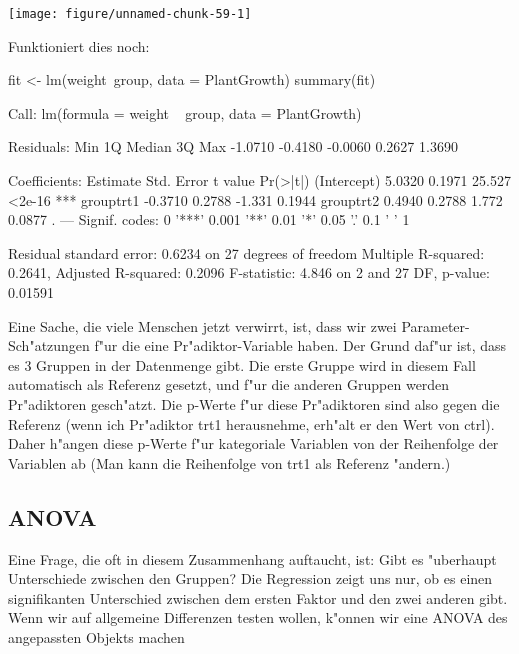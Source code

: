 \documentclass[a4paper,twoside]{tufte-book}\usepackage[]{graphicx}\usepackage[]{color}
\makeatletter
\def\maxwidth{ %
  \ifdim\Gin@nat@width>\linewidth
    \linewidth
  \else
    \Gin@nat@width
  \fi
}
\makeatother
\begin{document}
\begin{appendices}
\begin{Schunk}
\texttt{[image: figure/unnamed-chunk-59-1]} \end{Schunk}

Funktioniert dies noch:

\begin{Schunk}
\begin{Sinput}
fit <- lm(weight~group, data = PlantGrowth)
summary(fit)
\end{Sinput}
\begin{Soutput}

Call:
lm(formula = weight ~ group, data = PlantGrowth)

Residuals:
    Min      1Q  Median      3Q     Max 
-1.0710 -0.4180 -0.0060  0.2627  1.3690 

Coefficients:
            Estimate Std. Error t value Pr(>|t|)    
(Intercept)   5.0320     0.1971  25.527   <2e-16 ***
grouptrt1    -0.3710     0.2788  -1.331   0.1944    
grouptrt2     0.4940     0.2788   1.772   0.0877 .  
---
Signif. codes:  0 '***' 0.001 '**' 0.01 '*' 0.05 '.' 0.1 ' ' 1

Residual standard error: 0.6234 on 27 degrees of freedom
Multiple R-squared:  0.2641,	Adjusted R-squared:  0.2096 
F-statistic: 4.846 on 2 and 27 DF,  p-value: 0.01591
\end{Soutput}
\end{Schunk}

Eine Sache, die viele Menschen jetzt verwirrt, ist, dass wir zwei Parameter-Sch"atzungen f"ur die eine Pr"adiktor-Variable haben. Der Grund daf"ur ist, dass es 3 Gruppen in der Datenmenge gibt. Die erste Gruppe wird in diesem Fall automatisch als Referenz gesetzt, und f"ur die anderen Gruppen werden Pr"adiktoren gesch"atzt. Die p-Werte f"ur diese Pr"adiktoren sind also gegen die Referenz (wenn ich Pr"adiktor trt1 herausnehme, erh"alt er den Wert von ctrl). Daher h"angen diese p-Werte f"ur kategoriale Variablen von der Reihenfolge der Variablen ab (Man kann die Reihenfolge von trt1 als Referenz "andern.)


\subsection{ANOVA}

Eine Frage, die oft in diesem Zusammenhang auftaucht, ist: Gibt es "uberhaupt Unterschiede zwischen den Gruppen? Die Regression zeigt uns nur, ob es einen signifikanten Unterschied zwischen dem ersten Faktor und den zwei anderen gibt. Wenn wir auf allgemeine Differenzen testen wollen, k"onnen wir eine ANOVA des angepassten Objekts machen


\end{appendices}
\end{document}
